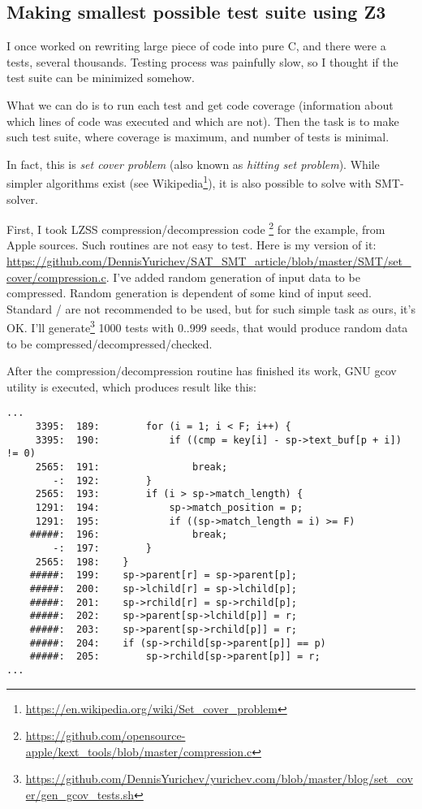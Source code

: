 \subsection{Making smallest possible test suite using Z3}
\label{set_cover}

I once worked on rewriting large piece of code into pure C, and there were a tests, several thousands.
Testing process was painfully slow, so I thought if the test suite can be minimized somehow.

What we can do is to run each test and get code coverage
(information about which lines of code was executed and which are not).
Then the task is to make such test suite, where coverage is maximum, and number of tests is minimal.

In fact, this is \textit{set cover problem} (also known as \textit{hitting set problem}).
While simpler algorithms exist (see Wikipedia\footnote{\url{https://en.wikipedia.org/wiki/Set_cover_problem}}),
it is also possible to solve with SMT-solver.

First, I took \ac{LZSS} compression/decompression code
\footnote{\url{https://github.com/opensource-apple/kext_tools/blob/master/compression.c}} for the example,
from Apple sources.
Such routines are not easy to test.
Here is my version of it:
\url{https://github.com/DennisYurichev/SAT_SMT_article/blob/master/SMT/set_cover/compression.c}.
I've added random generation of input data to be compressed.
Random generation is dependent of some kind of input seed.
Standard / are not recommended to be used, but for such simple task as ours, it's OK.
I'll generate\footnote{\url{https://github.com/DennisYurichev/yurichev.com/blob/master/blog/set_cover/gen_gcov_tests.sh}}
1000 tests with 0..999 seeds, that would produce random data to be compressed/decompressed/checked.

After the compression/decompression routine has finished its work,
GNU gcov utility is executed, which produces result like this:

\begin{lstlisting}
...
     3395:  189:        for (i = 1; i < F; i++) {
     3395:  190:            if ((cmp = key[i] - sp->text_buf[p + i]) != 0)
     2565:  191:                break;
        -:  192:        }
     2565:  193:        if (i > sp->match_length) {
     1291:  194:            sp->match_position = p;
     1291:  195:            if ((sp->match_length = i) >= F)
    #####:  196:                break;
        -:  197:        }
     2565:  198:    }
    #####:  199:    sp->parent[r] = sp->parent[p];
    #####:  200:    sp->lchild[r] = sp->lchild[p];
    #####:  201:    sp->rchild[r] = sp->rchild[p];
    #####:  202:    sp->parent[sp->lchild[p]] = r;
    #####:  203:    sp->parent[sp->rchild[p]] = r;
    #####:  204:    if (sp->rchild[sp->parent[p]] == p)
    #####:  205:        sp->rchild[sp->parent[p]] = r;
...
\end{lstlisting}

